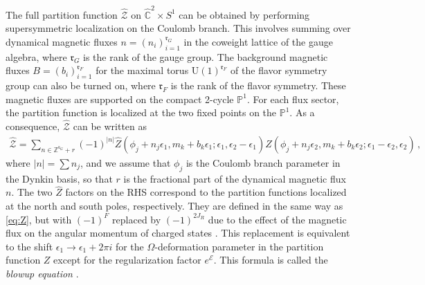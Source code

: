 \documentclass[11pt, a4paper]{article}
\theoremstyle{definition}
\begin{document}
The full partition function $ \hat{\mathcal{Z}} $ on $ \hat{\mathbb{C}}^2 \times S^1 $ can be obtained by performing supersymmetric localization on the Coulomb branch. This involves summing over dynamical magnetic fluxes $ n=(n_i)_{i=1}^{\mathfrak{r}_G} $ in the coweight lattice of the gauge algebra, where $ \mathfrak{r}_G $ is the rank of the gauge group. The background magnetic fluxes $ B=(b_i)_{i=1}^{\mathfrak{r}_F} $ for the maximal torus $ \mathrm{U}(1)^{\mathfrak{r}_F} $ of the flavor symmetry group can also be turned on, where $ \mathfrak{r}_F $ is the rank of the flavor symmetry. These magnetic fluxes are supported on the compact 2-cycle $ \mathbb{P}^1 $. For each flux sector, the partition function is localized at the two fixed points on the $ \mathbb{P}^1 $. As a consequence, $ \hat{\mathcal{Z}} $ can be written as
\begin{align}\label{eq:blowup}
    \hat{\mathcal{Z}} = \sum_{n\in \mathbb{Z}^{\mathfrak{r}_G}+r} (-1)^{|n|} \hat{Z}(\phi_j+n_j \epsilon_1, m_k+b_k \epsilon_1; \epsilon_1, \epsilon_2-\epsilon_1) \hat{Z}(\phi_j + n_j\epsilon_2, m_k+b_k\epsilon_2; \epsilon_1-\epsilon_2, \epsilon_2) \, ,
\end{align}
where $ |n|=\sum n_j $, and we assume that $ \phi_j $ is the Coulomb branch parameter in the Dynkin basis, so that $ r $ is the fractional part of the dynamical magnetic flux $ n $. The two $ \hat{Z} $ factors on the RHS correspond to the partition functions localized at the north and south poles, respectively. They are defined in the same way as \eqref{eq:Z}, but with $ (-1)^F $ replaced by $ (-1)^{2J_R} $ due to the effect of the magnetic flux on the angular momentum of charged states \cite{Huang:2017mis, Kim:2020hhh}. This replacement is equivalent to the shift $ \epsilon_1 \to \epsilon_1+2\pi i $ for the $ \Omega $-deformation parameter in the partition function $ Z $ except for the regularization factor $ e^{\mathcal{E}} $. This formula is called the \emph{blowup equation} \cite{Nakajima:2003pg, Nakajima:2005fg, Gottsche:2006bm}.
\end{document}

